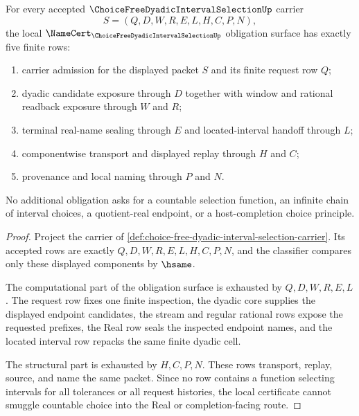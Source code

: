 \begin{theorem}
\label{thm:choice-free-dyadic-interval-selection-obligations}
For every accepted $\ChoiceFreeDyadicIntervalSelectionUp$ carrier
$$
S=(Q,D,W,R,E,L,H,C,P,N),
$$
the local $\NameCert_{\ChoiceFreeDyadicIntervalSelectionUp}$ obligation surface has exactly five finite rows:
\begin{enumerate}
\item carrier admission for the displayed packet $S$ and its finite request row $Q$;
\item dyadic candidate exposure through $D$ together with window and rational readback exposure through $W$ and $R$;
\item terminal real-name sealing through $E$ and located-interval handoff through $L$;
\item componentwise transport and displayed replay through $H$ and $C$;
\item provenance and local naming through $P$ and $N$.
\end{enumerate}
No additional obligation asks for a countable selection function, an infinite chain of interval choices, a quotient-real endpoint, or a host-completion choice principle.
\end{theorem}
\begin{proof}
Project the carrier of \autoref{def:choice-free-dyadic-interval-selection-carrier}. Its accepted rows are exactly $Q,D,W,R,E,L,H,C,P,N$, and the classifier compares only these displayed components by $\hsame$.

The computational part of the obligation surface is exhausted by $Q,D,W,R,E,L$. The request row fixes one finite inspection, the dyadic core supplies the displayed endpoint candidates, the stream and regular rational rows expose the requested prefixes, the Real row seals the inspected endpoint names, and the located interval row repacks the same finite dyadic cell.

The structural part is exhausted by $H,C,P,N$. These rows transport, replay, source, and name the same packet. Since no row contains a function selecting intervals for all tolerances or all request histories, the local certificate cannot smuggle countable choice into the Real or completion-facing route.
\end{proof}

